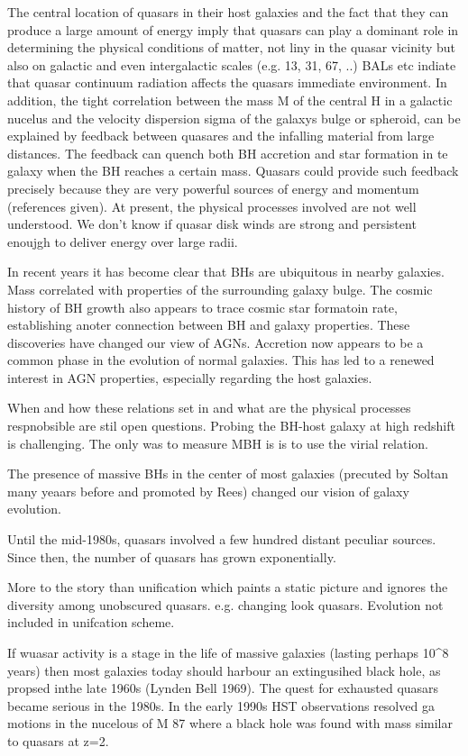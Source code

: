 The central location of quasars in their host galaxies and the fact that they can produce a large amount of energy imply that quasars can play a dominant role in determining the physical conditions of matter, not liny in the quasar vicinity but also on galactic and even intergalactic scales (e.g. 13, 31, 67, ..) 
BALs etc indiate that quasar continuum radiation affects the quasars immediate environment.  In addition, the tight correlation between the mass M of the central H in a galactic nucelus and the velocity dispersion sigma of the galaxys bulge or spheroid, can be explained by feedback between quasares and the infalling material from large distances.  The feedback can quench both BH accretion and star formation in te galaxy when the BH reaches a certain mass. Quasars could provide such feedback precisely because they are very powerful sources of energy and momentum (references given). At present, the physical processes involved are not well understood. We don't know if quasar disk winds are strong and persistent enoujgh to deliver energy over large radii. 

In recent years it has become clear that BHs are ubiquitous in nearby galaxies. 
Mass correlated with properties of the surrounding galaxy bulge. 
The cosmic history of BH growth also appears to trace cosmic star formatoin rate, establishing anoter connection between BH and galaxy properties. 
These discoveries have changed our view of AGNs.
Accretion now appears to be a common phase in the evolution of normal galaxies. 
This has led to a renewed interest in AGN properties, especially regarding the host galaxies. 

When and how these relations set in and what are the physical processes respnobsible are stil  open questions. 
Probing the BH-host galaxy at high redshift is challenging. 
The only was to measure MBH is is to use the virial relation. 

The presence of massive BHs in the center of most galaxies (precuted by Soltan many yeaars before and promoted by Rees) changed our vision of galaxy evolution. 

Until the mid-1980s, quasars involved a few hundred distant peculiar sources.
Since then, the number of quasars has grown exponentially.

More to the story than unification which paints a static picture and ignores the diversity among unobscured quasars. e.g. changing look quasars. Evolution not included in unifcation scheme. 


If wuasar activity is a stage in the life of massive galaxies (lasting perhaps 10^8 years) then most galaxies today should harbour an extingusihed black hole, as propsed inthe late 1960s (Lynden Bell 1969). The quest for exhausted quasars became serious in the 1980s. In the early 1990s HST observations resolved ga motions in the nucelous of M 87 where a black hole was found with mass similar to quasars at z=2. 

